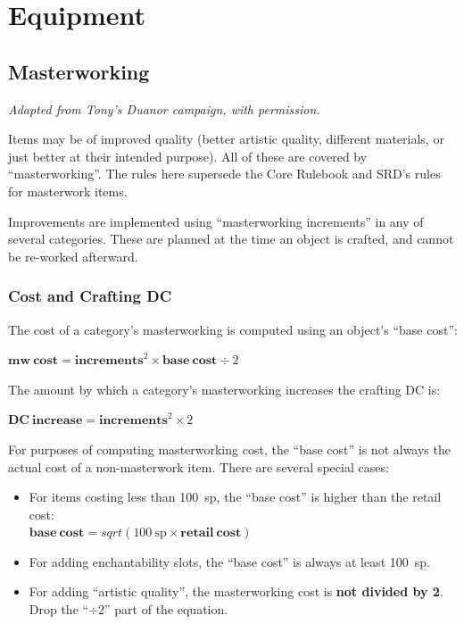 
\chapter{Equipment}
\label{sect-equip}

%
%
\section{Masterworking}

\textit{Adapted from Tony's Duanor campaign, with permission.}

Items may be of improved quality (better artistic quality, different
materials, or just better at their intended purpose). All of these are
covered by ``masterworking''. The rules here supersede the Core Rulebook
and SRD's rules for masterwork items.

Improvements are implemented using ``masterworking increments'' in any
of several categories. These are planned at the time an object is crafted,
and cannot be re-worked afterward.

%
\subsection{Cost and Crafting DC}

The cost of a category's masterworking is computed using an object's
``base cost'':
\begin{center}
$\mathbf{mw~cost} = \mathbf{increments}^2 \times \mathbf{base~cost} \div 2$
\end{center}

The amount by which a category's masterworking increases the crafting DC
is:
\begin{center}
$\mathbf{DC~increase} = \mathbf{increments}^2 \times 2$
\end{center}

For purposes of computing masterworking cost, the ``base cost'' is not
always the actual cost of a non-masterwork item. There are several special
cases:
\begin{itemize}
%
\item For items costing less than 100~sp, the ``base cost'' is higher than
the retail cost:\\
$\mathbf{base~cost} = sqrt( 100~\mathrm{sp} \times \mathbf{retail~cost} )$
%
\item For adding enchantability slots, the ``base cost'' is always at least
100~sp.
%
\item For adding ``artistic quality'', the masterworking cost is
\textbf{not divided by 2}. Drop the ``$\div 2$'' part of the equation.
%
\end{itemize}
%

